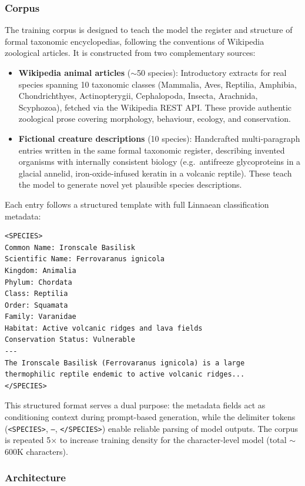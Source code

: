 \documentclass[12pt,a4paper]{article}
\begin{document}
\subsubsection{Corpus}

The training corpus is designed to teach the model the register and structure of formal taxonomic encyclopedias, following the conventions of Wikipedia zoological articles. It is constructed from two complementary sources:

\begin{itemize}
    \item \textbf{Wikipedia animal articles} ($\sim$50 species): Introductory extracts for real species spanning 10 taxonomic classes (Mammalia, Aves, Reptilia, Amphibia, Chondrichthyes, Actinopterygii, Cephalopoda, Insecta, Arachnida, Scyphozoa), fetched via the Wikipedia REST API. These provide authentic zoological prose covering morphology, behaviour, ecology, and conservation.
    \item \textbf{Fictional creature descriptions} (10 species): Handcrafted multi-paragraph entries written in the same formal taxonomic register, describing invented organisms with internally consistent biology (e.g.\ antifreeze glycoproteins in a glacial annelid, iron-oxide-infused keratin in a volcanic reptile). These teach the model to generate novel yet plausible species descriptions.
\end{itemize}

Each entry follows a structured template with full Linnaean classification metadata:

\begin{verbatim}
<SPECIES>
Common Name: Ironscale Basilisk
Scientific Name: Ferrovaranus ignicola
Kingdom: Animalia
Phylum: Chordata
Class: Reptilia
Order: Squamata
Family: Varanidae
Habitat: Active volcanic ridges and lava fields
Conservation Status: Vulnerable
---
The Ironscale Basilisk (Ferrovaranus ignicola) is a large
thermophilic reptile endemic to active volcanic ridges...
</SPECIES>
\end{verbatim}

This structured format serves a dual purpose: the metadata fields act as conditioning context during prompt-based generation, while the delimiter tokens (\texttt{<SPECIES>}, \texttt{---}, \texttt{</SPECIES>}) enable reliable parsing of model outputs. The corpus is repeated 5$\times$ to increase training density for the character-level model (total $\sim$600K characters).

\subsubsection{Architecture}
\end{document}
